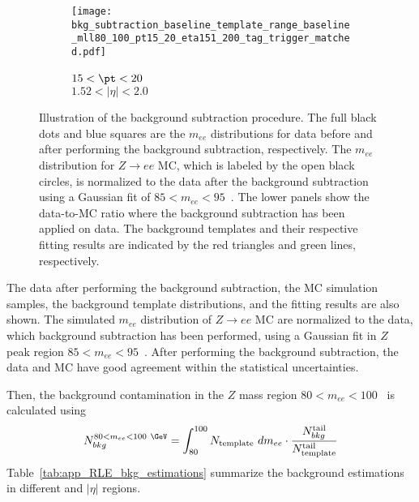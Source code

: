 \begin{figure}[htbp]
\begin{subfigure}[b]{0.32\textwidth}
    \end{subfigure}
    \begin{subfigure}[b]{0.32\textwidth}
        \begin{center}
            \texttt{[image: bkg\_subtraction\_baseline\_template\_range\_baseline\_mll80\_100\_pt15\_20\_eta151\_200\_tag\_trigger\_matched.pdf]}
            \caption{$15 < \pt < 20$~{\GeV}\\$1.52<|\eta|<2.0$}
        \end{center}
    \end{subfigure}
    \caption{Illustration of the background subtraction procedure.
    The full black dots and blue squares are the $m_{ee}$ distributions for data before and after performing the background subtraction, respectively.
    The $m_{ee}$ distribution for $Z \to ee$ MC, which is labeled by the open black circles, is normalized to the data after the background subtraction using a Gaussian fit of $85 < m_{ee} < 95$~{\GeV}.
    The lower panels show the data-to-MC ratio where the background subtraction has been applied on data.
    The background templates and their respective fitting results are indicated by the red triangles and green lines, respectively.
    }
    \label{fig:app_RLE_bkg_estimations}
\end{figure}

The data after performing the background subtraction, the MC simulation samples, the background template distributions, and the fitting results are also shown.
The simulated $m_{ee}$ distribution of $Z \to ee$ MC are normalized to the data, which background subtraction has been performed, using a Gaussian fit in $Z$ peak region $85 < m_{ee} < 95$~{\GeV}.
After performing the background subtraction, the data and MC have good agreement within the statistical uncertainties.

Then, the background contamination in the $Z$ mass region $80 < m_{ee} < 100$~{\GeV} is calculated using
%
\begin{equation}
    N_{bkg}^{80 < m_{ee} < 100~{\GeV}} = \int_{80}^{100} N_\mathrm{template} \ dm_{ee} \cdot \frac{N_{bkg}^\mathrm{tail}}{N_\mathrm{template}^\mathrm{tail}}
    \label{eq:RLE_bkg_in_80_mll_100}
\end{equation}
%
Table~\ref{tab:app_RLE_bkg_estimations} summarize the background estimations in different \pt and $|\eta|$ regions.

